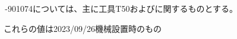 \clearpage
\,-\ttNum901074については、主に工具{\ttfamily T50}\TouchSensorProbe および\ToolMeasurementTouchSensorProbe に関するものとする。

\begin{marker}
これらの値は2023/09/26機械設置時のもの
\end{marker}
